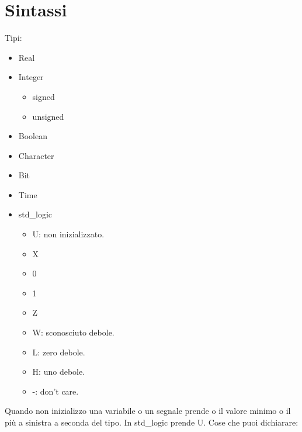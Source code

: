 \documentclass[10pt,a4paper,oneside]{scrbook}
\begin{document}
\section{Sintassi}
Tipi:\\
\begin{itemize}
    \item Real
    \item Integer
    \begin{itemize}
        \item signed
        \item unsigned
    \end{itemize}
    \item Boolean
    \item Character
    \item Bit
    \item Time
    \item std\_logic
    \begin{itemize}
        \item U: non inizializzato.
        \item X
        \item 0
        \item 1
        \item Z
        \item W: sconosciuto debole.
        \item L: zero debole.
        \item H: uno debole.
        \item -: don't care.
    \end{itemize}
\end{itemize}
Quando non inizializzo una variabile o un segnale prende o il valore minimo o il più a sinistra a seconda del tipo. In std\_logic prende U.
Cose che puoi dichiarare:\\
\end{document}
